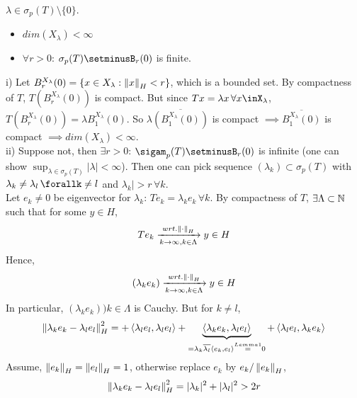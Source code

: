 \begin{lemma}[Lemma 2]
    $\lambda\in\sigma_p(T)\setminus\{0\}$. 
    \begin{itemize}
        \item $dim(X_\lambda)<\infty$
        \item $\forall r>0$: $\sigma_p(T)\setminusB_r(0)$ is finite.
    \end{itemize}
    \begin{pf}{}{}
        i) Let $B_r^{X_\lambda}(0)=\{x\in X_\lambda:\left\|{x}\right\|_H<r\}$, which is a bounded set. By compactness of $T$, $T(B_r^{X_\lambda}(0))$ is compact. But since $Tx=\lambda x\,\forall x\inX_\lambda$, $T(B_r^{X_\lambda}(0))=\lambda B_1^{X_\lambda}(0)$. So $\lambda\overline{(B_1^{X_\lambda}(0))}$ is compact $\implies \overline{B_1^{X_\lambda}(0)}$ is compact $\implies dim(X_\lambda)<\infty$.\\
        ii) Suppose not, then $\exists r>0$: $\sigam_p(T)\setminusB_r(0)$ is infinite (one can show $\sup_{\lambda\in\sigma_p(T)}|\lambda|<\infty$). Then one can pick sequence $(\lambda_k)\subset\sigma_p(T)$ with $\lambda_k\neq\lambda_l\,\forallk\neq l$ and $\lambda_k|>r\,\forall k$.\\
        Let $e_k\neq0$ be eigenvector for $\lambda_k$: $Te_k=\lambda_ke_k\,\forall k$.
        By compactness of $T$, $\exists\Lambda\subset\mathbb{N}$ such that for some $y\in H$, $$Te_k\xrightarrow[k\to\infty,k\in\Lambda]{wrt.\left\|{\cdot}\right\|_H}y\in H$$
        Hence,
        $$(\lambda_ke_k)\xrightarrow[k\to\infty,k\in\Lambda]{wrt.\left\|{\cdot}\right\|_H}y\in H$$
        In particular, $(\lambda_ke_k)){k\in\Lambda}$ is Cauchy. But for $k\neq l$,
        $$\left\|{\lambda_ke_k-\lambda_le_l}\right\|^2_H=
        +\left<{\lambda_le_l},{\lambda_le_l}\right>
        +\underbrace{\left<{\lambda_ke_k},{\lambda_le_l}\right>}_{=\lambda_k\overline{\lambda_l}\left<{e_k},{e_l}\right>\stackrel{Lemma1}{=}0}
        +\left<{\lambda_le_l},{\lambda_ke_k}\right>
        $$
        Assume, $\left\|{e_k}\right\|_H=\left\|{e_l}\right\|_H=1$, otherwise replace $e_k$ by $e_k/\left\|{e_k}\right\|_H$,
        $$
        \left\|{\lambda_ke_k-\lambda_le_l}\right\|^2_H=|\lambda_k|^2+|\lambda_l|^2>2r
        $$
    \end{pf}
\end{lemma}

